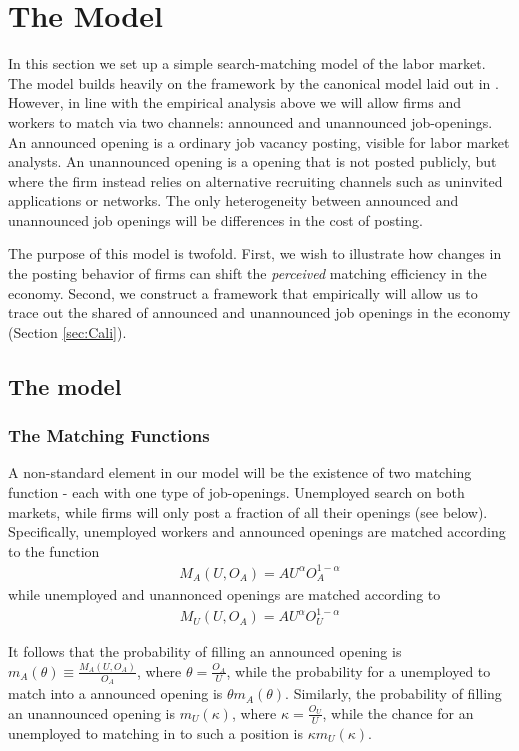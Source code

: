 \documentclass[11pt,article]{memoir}
\begin{document}
\section{The Model}
\label{sec:model}
In this section we set up a simple search-matching model of the labor market. The model builds heavily on the framework by the canonical model laid out in \cite{Pissarides2000}. However,  in line with the empirical analysis above we will allow firms and workers to match via two channels: announced and unannounced job-openings. An announced opening is a ordinary job vacancy posting, visible for labor market analysts. An unannounced opening is a opening that is not posted publicly, but where the firm instead relies on alternative recruiting channels such as uninvited applications or networks. The only heterogeneity between announced and unannounced job openings will be differences in the cost of posting.

The purpose of this model is twofold. First, we wish to illustrate how changes in the posting behavior of firms can shift the \emph{perceived} matching efficiency in the economy. Second, we construct a framework that empirically will allow us to trace out the shared of announced and unannounced job openings in the economy (Section \ref{sec:Cali}). 

\subsection{The model}


\subsubsection{The Matching Functions}

A non-standard element in our model will be the existence of two matching function - each with one type of job-openings. Unemployed search on both markets, while firms will only post a fraction of all their openings (see below). Specifically, unemployed workers and announced openings are matched according to the function
\begin{align}
M_A \left( U, O_A \right)= A U ^\alpha O_A^{ 1-\alpha }
\label{eq:M_A}
\end{align}
while unemployed and unannonced openings are matched according to 
\begin{align}
M_U \left( U, O_A \right)= A U ^\alpha O_U^{ 1-\alpha } 
\label{eq:M_U}
\end{align}

It follows that the probability of filling an announced opening is $m_A(\theta) \equiv \frac{M_A \left( U, O_A \right)}{O_A}$, where $\theta=\frac{O_A}{U}$, while the probability for a unemployed to match into a announced opening is $\theta m_A(\theta)$. Similarly, the probability of filling an unannounced opening is $m_U (\kappa)$, where $\kappa=\frac{O_U}{U}$,  while the chance for an unemployed to matching in to such a position is $\kappa m_U (\kappa)$.
\end{document}
